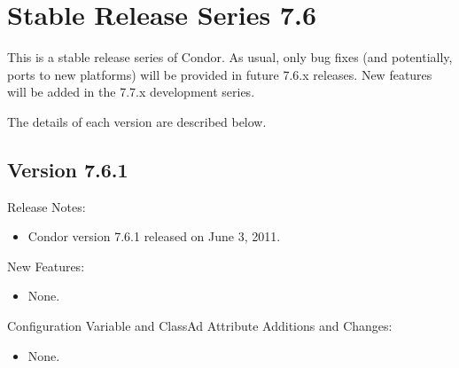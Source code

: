
\section{\label{sec:History-7-6}Stable Release Series 7.6}

This is a stable release series of Condor.
As usual, only bug fixes (and potentially, ports to new platforms)
will be provided in future 7.6.x releases.
New features will be added in the 7.7.x development series.

The details of each version are described below.

\subsection*{\label{sec:New-7-6-1}Version 7.6.1}

\noindent Release Notes:

\begin{itemize}

\item Condor version 7.6.1 released on June 3, 2011.

\end{itemize}


\noindent New Features:

\begin{itemize}

\item None.

\end{itemize}

\noindent Configuration Variable and ClassAd Attribute Additions and Changes:

\begin{itemize}

\item None.

\end{itemize}

